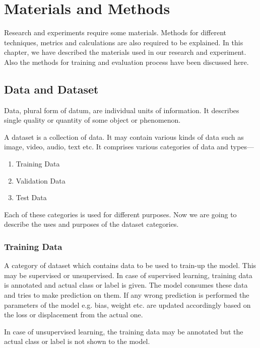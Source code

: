 \chapter{Materials and Methods}
    Research and experiments require some materials. Methods for different techniques, metrics and calculations are also required to be explained. In this chapter, we have described the materials used in our research and experiment. Also the methods for training and evaluation process have been discussed here.
    
    \section{Data and Dataset}
        Data, plural form of datum, are individual units of information. It describes single quality or quantity of some object or phenomenon\cite{renear2010definitions}.
        
        A dataset is a collection of data. It may contain various kinds of data such as image, video, audio, text etc. It comprises various categories of data and types\cite{kononenko2007machine}---
        \begin{enumerate}
         \item Training Data
         \item Validation Data
         \item Test Data
        \end{enumerate}
        Each of these categories is used for different purposes. Now we are going to describe the uses and purposes of the dataset categories.
        
        \subsection{Training Data}
            A category of dataset which contains data to be used to train-up the model. This may be supervised or unsupervised. In case of supervised learning, training data is annotated and actual class or label is given\cite{kotsiantis2007supervised}. The model consumes these data and tries to make prediction on them. If any wrong prediction is performed the parameters of the model e.g. bias, weight etc. are updated accordingly based on the loss or displacement from the actual one\cite{kotsiantis2007supervised}.
            
            In case of unsupervised learning, the training data may be annotated but the actual class or label is not shown to the model\cite{ma2008unsupervised}.
            
